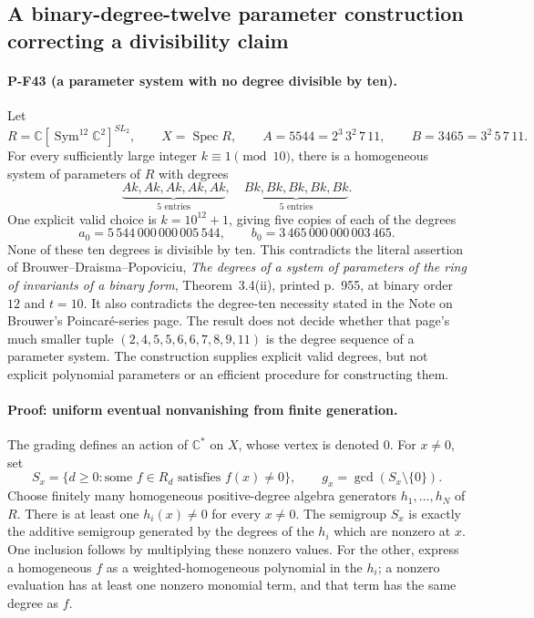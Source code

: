 \subsection{A binary-degree-twelve parameter construction correcting a divisibility claim}
\label{sec:binary12-hsop}

\paragraph{P-F43 (a parameter system with no degree divisible by ten).}
Let
\[
 R=\mathbb C[\operatorname{Sym}^{12}\mathbb C^2]^{SL_2},
 \qquad X=\operatorname{Spec}R,
 \qquad A=5544=2^3\,3^2\,7\,11,
 \qquad B=3465=3^2\,5\,7\,11.
\]
For every sufficiently large integer $k\equiv1\pmod {10}$,
there is a homogeneous system of parameters of $R$ with degrees
\[
 \underbrace{Ak,Ak,Ak,Ak,Ak}_{5\text{ entries}},\quad
 \underbrace{Bk,Bk,Bk,Bk,Bk}_{5\text{ entries}}.
 \tag{P-F43a}
\]
One explicit valid choice is $k=10^{12}+1$, giving five copies
of each of the degrees
\[
 a_0=5\,544\,000\,000\,005\,544,\qquad
 b_0=3\,465\,000\,000\,003\,465.
 \tag{P-F43a'}
\]
None of these ten degrees is divisible by ten. This contradicts
the literal assertion of Brouwer--Draisma--Popoviciu,
\emph{The degrees of a system of parameters of the ring of
invariants of a binary form}, Theorem~3.4(ii), printed p.~955,
at binary order $12$ and $t=10$. It also contradicts the
degree-ten necessity stated in the Note on Brouwer's
Poincar\'e-series page. The result does not decide whether
that page's much smaller tuple
$(2,4,5,5,6,6,7,8,9,11)$ is the degree sequence of a parameter
system. The construction supplies explicit valid degrees,
but not explicit polynomial parameters or an efficient
procedure for constructing them.

\paragraph{Proof: uniform eventual nonvanishing from finite generation.}
The grading defines an action of $\mathbb C^*$ on $X$, whose
vertex is denoted $0$. For $x\ne0$, set
\[
 S_x=\{d\ge0:\text{some }f\in R_d\text{ satisfies }f(x)\ne0\},
 \qquad g_x=\gcd(S_x\setminus\{0\}).
 \tag{P-F43b}
\]
Choose finitely many homogeneous positive-degree algebra
generators $h_1,\ldots,h_N$ of $R$. There is at least one
$h_i(x)\ne0$ for every $x\ne0$. The semigroup $S_x$ is exactly
the additive semigroup generated by the degrees of the
$h_i$ which are nonzero at $x$. One inclusion follows by
multiplying these nonzero values. For the other, express a
homogeneous $f$ as a weighted-homogeneous polynomial in the
$h_i$; a nonzero evaluation has at least one nonzero monomial
term, and that term has the same degree as $f$.

